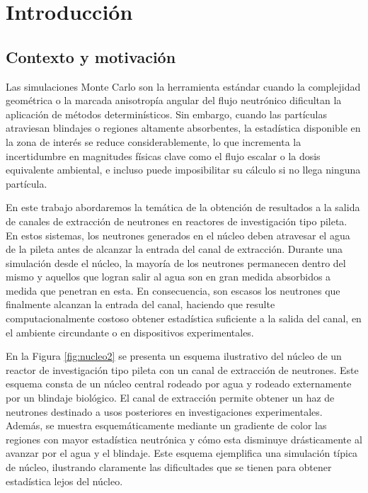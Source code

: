 \chapter{Introducción}

\section{Contexto y motivación}

Las simulaciones Monte Carlo son la herramienta estándar cuando la complejidad geométrica o la marcada anisotropía angular del flujo neutrónico dificultan la aplicación de métodos determinísticos. Sin embargo, cuando las partículas atraviesan blindajes o regiones altamente absorbentes, la estadística disponible en la zona de interés se reduce considerablemente, lo que incrementa la incertidumbre en magnitudes físicas clave como el flujo escalar o la dosis equivalente ambiental, e incluso puede imposibilitar su cálculo si no llega ninguna partícula. 


En este trabajo abordaremos la temática de la obtención de resultados a la salida de canales de extracción de neutrones en reactores de investigación tipo pileta. En estos sistemas, los neutrones generados en el núcleo deben atravesar el agua de la pileta antes de alcanzar la entrada del canal de extracción. Durante una simulación desde el núcleo, la mayoría de los neutrones permanecen dentro del mismo y aquellos que logran salir al agua son en gran medida absorbidos a medida que penetran en esta. En consecuencia, son escasos los neutrones que finalmente alcanzan la entrada del canal, haciendo que resulte computacionalmente costoso obtener estadística suficiente a la salida del canal, en el ambiente circundante o en dispositivos experimentales.

En la Figura \ref{fig:nucleo2} se presenta un esquema ilustrativo del núcleo de un reactor de investigación tipo pileta con un canal de extracción de neutrones. Este esquema consta de un núcleo central rodeado por agua y rodeado externamente por un blindaje biológico. El canal de extracción permite obtener un haz de neutrones destinado a usos posteriores en investigaciones experimentales. Además, se muestra esquemáticamente mediante un gradiente de color las regiones con mayor estadística neutrónica y cómo esta disminuye drásticamente al avanzar por el agua y el blindaje. Este esquema ejemplifica una simulación típica de núcleo, ilustrando claramente las dificultades que se tienen para obtener estadística lejos del núcleo.

